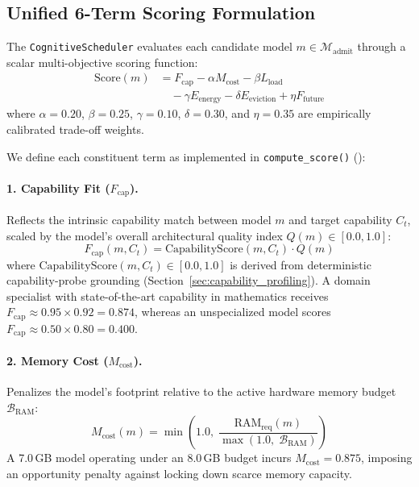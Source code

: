\subsection{Unified 6-Term Scoring Formulation}
\label{sec:scoring_formulation}

The \texttt{CognitiveScheduler} evaluates each candidate model $m \in \mathcal{M}_{\text{admit}}$ through a scalar multi-objective scoring function:
\begin{equation}
\boxed{
\begin{aligned}
\text{Score}(m) &= F_{\text{cap}} - \alpha M_{\text{cost}} - \beta L_{\text{load}} \\
&\quad - \gamma E_{\text{energy}} - \delta E_{\text{eviction}} + \eta F_{\text{future}}
\end{aligned}
}
\label{eq:unified_score}
\end{equation}
where $\alpha = 0.20$, $\beta = 0.25$, $\gamma = 0.10$, $\delta = 0.30$, and $\eta = 0.35$ are empirically calibrated trade-off weights. 

We define each constituent term as implemented in \texttt{compute\_score()} ():

\paragraph{1. Capability Fit ($F_{\text{cap}}$).}
Reflects the intrinsic capability match between model $m$ and target capability $C_t$, scaled by the model's overall architectural quality index $Q(m) \in [0.0, 1.0]$:
\begin{equation}
F_{\text{cap}}(m, C_t) = \text{CapabilityScore}(m, C_t) \cdot Q(m)
\end{equation}
where $\text{CapabilityScore}(m, C_t) \in [0.0, 1.0]$ is derived from deterministic capability-probe grounding (Section~\ref{sec:capability_profiling}). A domain specialist with state-of-the-art capability in mathematics receives $F_{\text{cap}} \approx 0.95 \times 0.92 = 0.874$, whereas an unspecialized model scores $F_{\text{cap}} \approx 0.50 \times 0.80 = 0.400$.

\paragraph{2. Memory Cost ($M_{\text{cost}}$).}
Penalizes the model's footprint relative to the active hardware memory budget $\mathcal{B}_{\text{RAM}}$:
\begin{equation}
M_{\text{cost}}(m) = \min\left(1.0, \;\frac{\text{RAM}_{\text{req}}(m)}{\max(1.0, \;\mathcal{B}_{\text{RAM}})}\right)
\end{equation}
A 7.0\,GB model operating under an 8.0\,GB budget incurs $M_{\text{cost}} = 0.875$, imposing an opportunity penalty against locking down scarce memory capacity.

